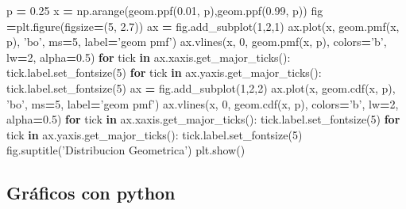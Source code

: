 \documentclass[]{book}
\newenvironment{Shaded}{\begin{snugshade}}{\end{snugshade}}
\newcommand{\ControlFlowTok}[1]{\textcolor[rgb]{0.13,0.29,0.53}{\textbf{#1}}}
\newcommand{\DecValTok}[1]{\textcolor[rgb]{0.00,0.00,0.81}{#1}}
\newcommand{\FloatTok}[1]{\textcolor[rgb]{0.00,0.00,0.81}{#1}}
\newcommand{\KeywordTok}[1]{\textcolor[rgb]{0.13,0.29,0.53}{\textbf{#1}}}
\newcommand{\NormalTok}[1]{#1}
\newcommand{\OperatorTok}[1]{\textcolor[rgb]{0.81,0.36,0.00}{\textbf{#1}}}
\newcommand{\StringTok}[1]{\textcolor[rgb]{0.31,0.60,0.02}{#1}}
\begin{document}
\begin{Shaded}
\begin{Highlighting}[]
\NormalTok{p }\OperatorTok{=} \FloatTok{0.25}
\NormalTok{x }\OperatorTok{=}\NormalTok{ np.arange(geom.ppf(}\FloatTok{0.01}\NormalTok{, p),geom.ppf(}\FloatTok{0.99}\NormalTok{, p))}
\NormalTok{fig }\OperatorTok{=}\NormalTok{plt.figure(figsize}\OperatorTok{=}\NormalTok{(}\DecValTok{5}\NormalTok{, }\FloatTok{2.7}\NormalTok{))}
\NormalTok{ax }\OperatorTok{=}\NormalTok{ fig.add_subplot(}\DecValTok{1}\NormalTok{,}\DecValTok{2}\NormalTok{,}\DecValTok{1}\NormalTok{)}
\NormalTok{ax.plot(x, geom.pmf(x, p), }\StringTok{'bo'}\NormalTok{, ms}\OperatorTok{=}\DecValTok{5}\NormalTok{, label}\OperatorTok{=}\StringTok{'geom pmf'}\NormalTok{)}
\NormalTok{ax.vlines(x, }\DecValTok{0}\NormalTok{, geom.pmf(x, p), colors}\OperatorTok{=}\StringTok{'b'}\NormalTok{, lw}\OperatorTok{=}\DecValTok{2}\NormalTok{, alpha}\OperatorTok{=}\FloatTok{0.5}\NormalTok{)}
\ControlFlowTok{for}\NormalTok{ tick }\KeywordTok{in}\NormalTok{ ax.xaxis.get_major_ticks():}
\NormalTok{  tick.label.set_fontsize(}\DecValTok{5}\NormalTok{)}
\ControlFlowTok{for}\NormalTok{ tick }\KeywordTok{in}\NormalTok{ ax.yaxis.get_major_ticks():}
\NormalTok{  tick.label.set_fontsize(}\DecValTok{5}\NormalTok{) }
\NormalTok{ax }\OperatorTok{=}\NormalTok{ fig.add_subplot(}\DecValTok{1}\NormalTok{,}\DecValTok{2}\NormalTok{,}\DecValTok{2}\NormalTok{)}
\NormalTok{ax.plot(x, geom.cdf(x, p), }\StringTok{'bo'}\NormalTok{, ms}\OperatorTok{=}\DecValTok{5}\NormalTok{, label}\OperatorTok{=}\StringTok{'geom pmf'}\NormalTok{)}
\NormalTok{ax.vlines(x, }\DecValTok{0}\NormalTok{, geom.cdf(x, p), colors}\OperatorTok{=}\StringTok{'b'}\NormalTok{, lw}\OperatorTok{=}\DecValTok{2}\NormalTok{, alpha}\OperatorTok{=}\FloatTok{0.5}\NormalTok{)}
\ControlFlowTok{for}\NormalTok{ tick }\KeywordTok{in}\NormalTok{ ax.xaxis.get_major_ticks():}
\NormalTok{  tick.label.set_fontsize(}\DecValTok{5}\NormalTok{)}
\ControlFlowTok{for}\NormalTok{ tick }\KeywordTok{in}\NormalTok{ ax.yaxis.get_major_ticks():}
\NormalTok{  tick.label.set_fontsize(}\DecValTok{5}\NormalTok{)}
\NormalTok{fig.suptitle(}\StringTok{'Distribucion Geometrica'}\NormalTok{)}
\NormalTok{plt.show()}
\end{Highlighting}
\end{Shaded}

\hypertarget{gruxe1ficos-con-python-1}{%
\subsection{Gráficos con python}\label{gruxe1ficos-con-python-1}}
\end{document}
